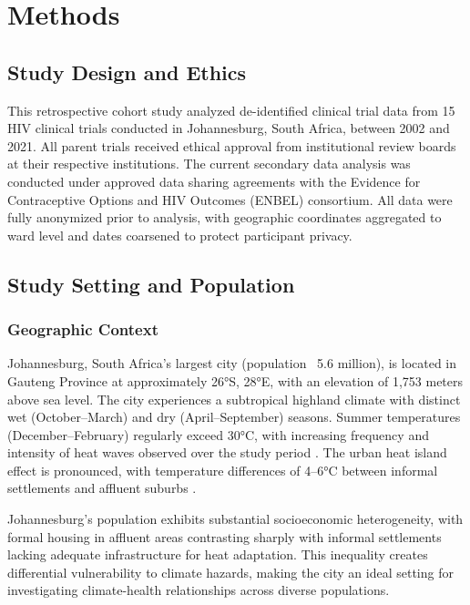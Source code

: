 \section{Methods}

\subsection{Study Design and Ethics}

This retrospective cohort study analyzed de-identified clinical trial data from 15 HIV clinical trials conducted in Johannesburg, South Africa, between 2002 and 2021. All parent trials received ethical approval from institutional review boards at their respective institutions. The current secondary data analysis was conducted under approved data sharing agreements with the Evidence for Contraceptive Options and HIV Outcomes (ENBEL) consortium. All data were fully anonymized prior to analysis, with geographic coordinates aggregated to ward level and dates coarsened to protect participant privacy.

\subsection{Study Setting and Population}

\subsubsection{Geographic Context}

Johannesburg, South Africa's largest city (population ~5.6 million), is located in Gauteng Province at approximately 26°S, 28°E, with an elevation of 1,753 meters above sea level. The city experiences a subtropical highland climate with distinct wet (October--March) and dry (April--September) seasons. Summer temperatures (December--February) regularly exceed 30°C, with increasing frequency and intensity of heat waves observed over the study period \citep{wright2021climate}. The urban heat island effect is pronounced, with temperature differences of 4--6°C between informal settlements and affluent suburbs \citep{gcro2019heatvuln}.

Johannesburg's population exhibits substantial socioeconomic heterogeneity, with formal housing in affluent areas contrasting sharply with informal settlements lacking adequate infrastructure for heat adaptation. This inequality creates differential vulnerability to climate hazards, making the city an ideal setting for investigating climate-health relationships across diverse populations.

